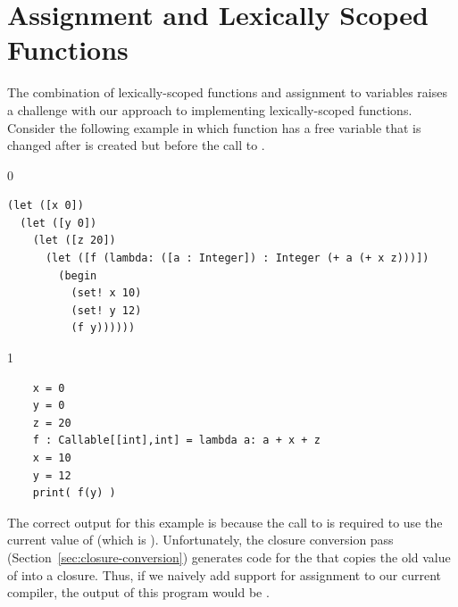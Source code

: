 \documentclass[7x10]{TimesAPriori_MIT}%
\def\racketEd{0}
\def\pythonEd{1}
\def\edition{1}
\begin{document}
\section{Assignment and Lexically Scoped Functions}
\label{sec:assignment-scoping}

The combination of lexically-scoped functions and assignment to
variables raises a challenge with our approach to implementing
lexically-scoped functions. Consider the following example in which
function  has a free variable  that is changed after
 is created but before the call to .
{\if\edition\racketEd
\begin{lstlisting}
(let ([x 0])
  (let ([y 0])
    (let ([z 20])
      (let ([f (lambda: ([a : Integer]) : Integer (+ a (+ x z)))])
        (begin
          (set! x 10)
          (set! y 12)
          (f y))))))
\end{lstlisting}
\fi}
{\if\edition\pythonEd
\begin{lstlisting}
    x = 0
    y = 0  
    z = 20
    f : Callable[[int],int] = lambda a: a + x + z
    x = 10
    y = 12
    print( f(y) )
\end{lstlisting}
\fi}
The correct output for this example is  because the call to
 is required to use the current value of  (which is
). Unfortunately, the closure conversion pass
(Section~\ref{sec:closure-conversion}) generates code for the
 that copies the old value of  into a
closure. Thus, if we naively add support for assignment to our current
compiler, the output of this program would be .
\end{document}
